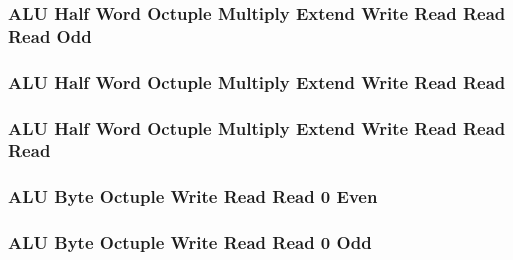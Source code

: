\subsubsection[{\small ALU Half Word Octuple Multiply Extend Write Read Read Read Odd}]{ALU Half Word Octuple Multiply Extend Write Read Read Read Odd} \label{sec:format-ALU-HOMEWRRRO}



\subsubsection[{\small ALU Half Word Octuple Multiply Extend Write Read Read}]{ALU Half Word Octuple Multiply Extend Write Read Read} \label{sec:format-ALU-HOMXWRR}



\subsubsection[{\small ALU Half Word Octuple Multiply Extend Write Read Read Read}]{ALU Half Word Octuple Multiply Extend Write Read Read Read} \label{sec:format-ALU-HOMXWRRR}



\subsubsection[{\small ALU Byte Octuple Write Read Read 0 Even}]{ALU Byte Octuple Write Read Read 0 Even} \label{sec:format-ALU-BOWRR0E}



\subsubsection[{\small ALU Byte Octuple Write Read Read 0 Odd}]{ALU Byte Octuple Write Read Read 0 Odd} \label{sec:format-ALU-BOWRR0O}



